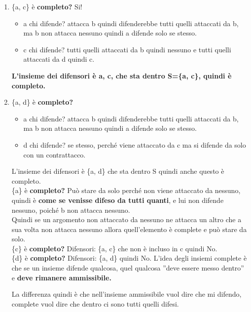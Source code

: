 \begin{enumerate}
    \item \{a, c\} è \textbf{completo?} Si!
          \begin{itemize}
              \item a chi difende? attacca b quindi difenderebbe tutti quelli attaccati da b, ma b non attacca nessuno quindi a difende solo se stesso.
              \item c chi difende? tutti quelli attaccati da b quindi nessuno e tutti quelli attaccati da d quindi c.
          \end{itemize}
          \textbf{L'insieme dei difensori è a, c, che sta dentro S=\{a, c\}, quindi è completo.}
    \item \{a, d\} è \textbf{completo?}
          \begin{itemize}
              \item a chi difende? attacca b quindi difenderebbe tutti quelli attaccati da b, ma b non attacca nessuno quindi a difende solo se stesso.
              \item d chi difende? se stesso, perché viene attaccato da c ma si difende da solo con un contrattacco.
          \end{itemize}
          L'insieme dei difensori è \{a, d\} che sta dentro S quindi anche questo è completo.
          \\\{a\} è \textbf{completo?} Può stare da solo perché non viene attaccato da nessuno, quindi è \textbf{come se venisse difeso da tutti quanti}, e lui non difende nessuno, poiché b non attacca nessuno.
          \\Quindi se un argomento non attaccato da nessuno ne attacca un altro che a sua volta non attacca nessuno allora quell'elemento è complete e può stare da solo.
          \\\{c\} è \textbf{completo?} Difensori: \{a, c\} che non è incluso in c quindi No.
          \\\{d\} è \textbf{completo?} Difensori: \{a, d\} quindi No. L'idea degli insiemi complete è che se un insieme difende qualcosa, quel qualcosa ”deve essere messo dentro” e \textbf{deve rimanere ammissibile.}

          \vspace{0.8cm}

          La differenza quindi è che nell'insieme ammissibile vuol dire che mi difendo, complete vuol dire che dentro ci sono tutti quelli difesi.
\end{enumerate}
\

